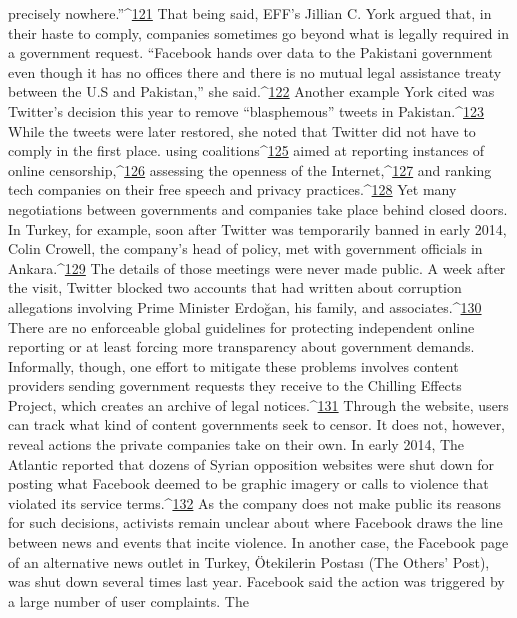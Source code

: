 precisely nowhere.''^{\href{#endnotes}{121}} That being said, EFF’s Jillian C. York argued that, in their haste to
comply, companies sometimes go beyond what is legally required in a government
request. ``Facebook hands over data to the Pakistani government even though it has no
offices there and there is no mutual legal assistance treaty between the U.S and Pakistan,''
she said.^{\href{#endnotes}{122}} Another example York cited was Twitter’s decision this year to remove
``blasphemous'' tweets in Pakistan.^{\href{#endnotes}{123}} While the tweets were later restored, she noted that
Twitter did not have to comply in the first place.
using coalitions^{\href{#endnotes}{125}} aimed at reporting instances of online censorship,^{\href{#endnotes}{126}} assessing the
openness of the Internet,^{\href{#endnotes}{127}} and ranking tech companies on their free speech and privacy
practices.^{\href{#endnotes}{128}} Yet many negotiations between governments and companies take place
behind closed doors. In Turkey, for example, soon after Twitter was temporarily banned
in early 2014, Colin Crowell, the company’s head of policy, met with government
officials in Ankara.^{\href{#endnotes}{129}} The details of those meetings were never made public. A week
after the visit, Twitter blocked two accounts that had written about corruption allegations
involving Prime Minister Erdoğan, his family, and associates.^{\href{#endnotes}{130}}
There are no enforceable global guidelines for protecting independent online reporting or
at least forcing more transparency about government demands. Informally, though, one
effort to mitigate these problems involves content providers sending government requests
they receive to the Chilling Effects Project, which creates an archive of legal notices.^{\href{#endnotes}{131}}
Through the website, users can track what kind of content governments seek to censor. It
does not, however, reveal actions the private companies take on their own.
In early 2014, The Atlantic reported that dozens of Syrian opposition websites were shut
down for posting what Facebook deemed to be graphic imagery or calls to violence that
violated its service terms.^{\href{#endnotes}{132}} As the company does not make public its reasons for such
decisions, activists remain unclear about where Facebook draws the line between news
and events that incite violence. In another case, the Facebook page of an alternative news
outlet in Turkey, Ötekilerin Postası (The Others’ Post), was shut down several times last
year. Facebook said the action was triggered by a large number of user complaints. The
